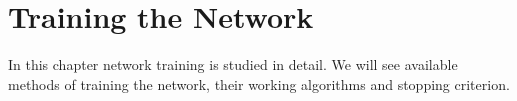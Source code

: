 

\chapter{Training the Network}\label{chap:training}

In this chapter network training is studied in detail. We will see available methods of training the network, their working algorithms and stopping criterion.